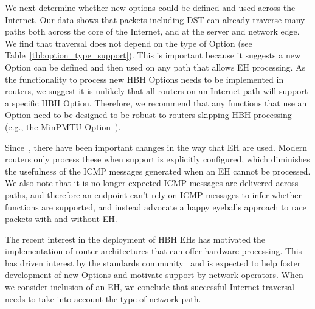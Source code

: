 \documentclass[conference]{IEEEtran}
\begin{document}
We next determine whether new options could be defined and used across the Internet.
Our  data  shows that packets including DST can already traverse many paths both across the core of the Internet, and at the server and network edge. 
We find that traversal does not depend on the type of Option  (see Table~\ref{tbl:option_type_support}). This is important because it suggests a new Option can be defined and then used on any path that allows EH processing. 
As the functionality to process new HBH Options needs to be implemented in routers, we suggest it is unlikely that all routers on an Internet path will support a specific HBH Option. Therefore, we recommend that any functions that use an Option need to be designed to be robust to routers skipping HBH processing (e.g., the MinPMTU  Option~\cite{rfc9268,rfc9343}). 


Since~\cite{rfc2460}, there have been important changes in the way that EH are used. Modern routers only process these when support is explicitly configured, which diminishes the usefulness of the ICMP messages generated when an EH cannot be processed. We also note that it is no longer expected ICMP messages are delivered across paths, and therefore an endpoint can't rely on ICMP messages to infer whether functions are supported, and instead advocate a happy eyeballs approach to race packets with and without EH.


The recent interest in the deployment of HBH EHs has motivated the implementation of router architectures that can offer hardware processing. This has driven interest by the standards community~\cite{ietf-6man-HBH-processing-06, ietf-v6ops-hbh-03, ietf-6man-eh-limits-02} and is expected to help foster development of new Options and motivate support by network operators. When we consider inclusion of an EH, we conclude that successful Internet traversal needs to take into account the type of network path.
\end{document}
